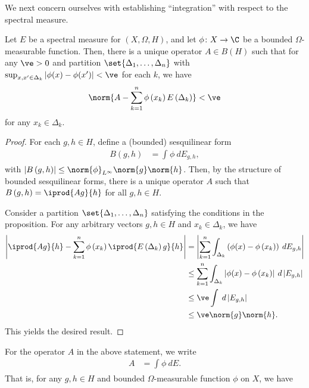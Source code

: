 \documentclass[10pt]{mypackage}
\begin{document}
We next concern ourselves with establishing ``integration'' with respect to the spectral measure.
\begin{proposition}
  Let $E$ be a spectral measure for $\left( X,\Omega,H \right)$, and let $\phi\colon X\rightarrow \C$ be a bounded $\Omega$-measurable function. Then, there is a unique operator $A\in B(H)$ such that for any $\ve > 0$ and partition $\set{\Delta_1,\dots,\Delta_n}$ with $\sup_{x,x'\in \Delta_k}\left\vert \phi(x)-\phi(x') \right\vert < \ve$ for each $k$, we have
  \begin{align*}
    \norm{A - \sum_{k=1}^{n}\phi\left( x_k \right)E\left( \Delta_k \right)} < \ve
  \end{align*}
  for any $x_k\in \Delta_k$.
\end{proposition}
\begin{proof}
  For each $g,h\in H$, define a (bounded) sesquilinear form
  \begin{align*}
    B\left( g,h \right) &= \int_{}^{} \phi\:dE_{g,h},
  \end{align*}
  with $\left\vert B\left( g,h \right) \right\vert \leq \norm{\phi}_{L^{\infty}}\norm{g}\norm{h}$. Then, by the structure of bounded sesquilinear forms, there is a unique operator $A$ such that $ B\left( g,h \right) = \iprod{Ag}{h} $ for all $g,h\in H$.

  Consider a partition $\set{\Delta_1,\dots,\Delta_n}$ satisfying the conditions in the proposition. For any arbitrary vectors $g,h\in H$ and $x_k\in \Delta_k$, we have
  \begin{align*}
    \left\vert \iprod{Ag}{h} - \sum_{k=1}^{n} \phi\left( x_k \right) \iprod{E\left( \Delta_k \right)g}{h} \right\vert &= \left\vert \sum_{k=1}^{n} \int_{\Delta_k}^{} \left( \phi(x)-\phi\left( x_k \right) \right)\:dE_{g,h} \right\vert\\
                  &\leq \sum_{k=1}^{n} \int_{\Delta_k}^{} \left\vert \phi(x)-\phi\left( x_k \right) \right\vert\:d\left\vert E_{g,h} \right\vert\\
                  &\leq \ve \int_{}^{} \:d\left\vert E_{g,h} \right\vert\\
                  &\leq \ve \norm{g}\norm{h}.
  \end{align*}
  This yields the desired result.
\end{proof}
For the operator $A$ in the above statement, we write
\begin{align*}
  A &= \int_{}^{} \phi\:dE.
\end{align*}
That is, for any $g,h\in H$ and bounded $\Omega$-measurable function $\phi$ on $X$, we have
\end{document}
